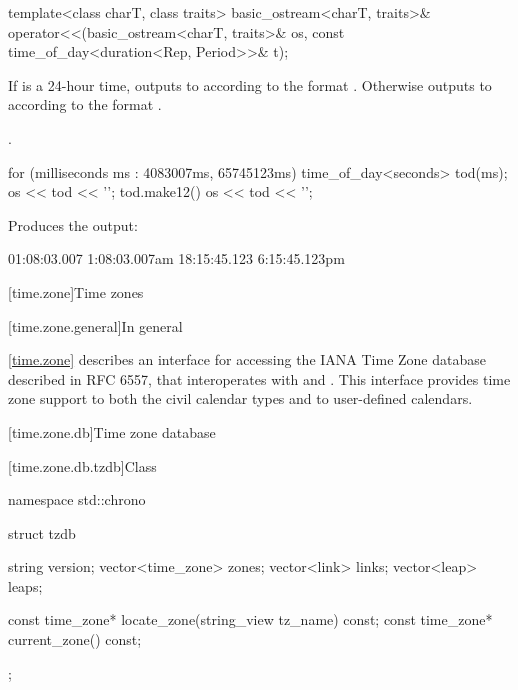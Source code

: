 %
\begin{itemdecl}
template<class charT, class traits>
  basic_ostream<charT, traits>&
    operator<<(basic_ostream<charT, traits>& os, const time_of_day<duration<Rep, Period>>& t);
\end{itemdecl}

\begin{itemdescr}
\pnum
\effects
If  is a 24-hour time,
outputs to  according to the format
.
Otherwise
outputs to  according to the format
.

\pnum
\returns {}.

\begin{example}
\begin{codeblock}
for (milliseconds ms : {4083007ms, 65745123ms}) {
  time_of_day<seconds> tod(ms);
  os << tod << '\n';
  tod.make12()
  os << tod << '\n';
}
\end{codeblock}

Produces the output:

\begin{codeblock}
01:08:03.007
1:08:03.007am
18:15:45.123
6:15:45.123pm
\end{codeblock}
\end{example}
\end{itemdescr}

[time.zone]{Time zones}

[time.zone.general]{In general}

\pnum
\ref{time.zone} describes an interface for accessing
the IANA Time Zone database described in RFC 6557,
that interoperates with  and .
This interface provides time zone support to
both the civil calendar types
and to user-defined calendars.

[time.zone.db]{Time zone database}

[time.zone.db.tzdb]{Class }

\begin{codeblock}
namespace std::chrono {
  struct tzdb {
    string            version;
    vector<time_zone> zones;
    vector<link>      links;
    vector<leap>      leaps;

    const time_zone* locate_zone(string_view tz_name) const;
    const time_zone* current_zone() const;
  };
}
\end{codeblock}

